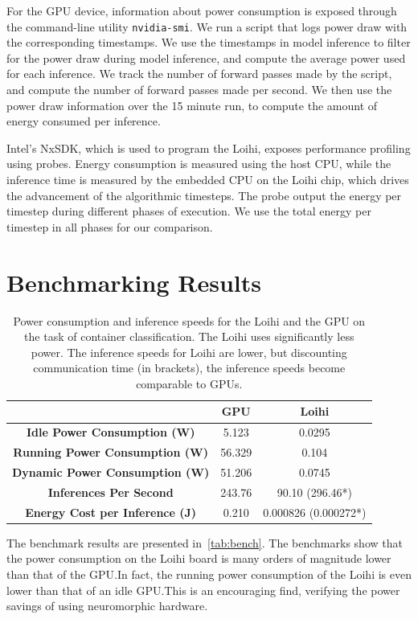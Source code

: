 \documentclass[fyp]{socreport}
\begin{document}
For the GPU device, information about power consumption is exposed through the
command-line utility \texttt{nvidia-smi}. We run a script that logs power draw
with the corresponding timestamps. We use the timestamps in model inference to
filter for the power draw during model inference, and compute the average power
used for each inference. We track the number of forward passes made by the
script, and compute the number of forward passes made per second. We then use
the power draw information over the 15 minute run, to compute the amount of
energy consumed per inference.

Intel's NxSDK, which is used to program the Loihi, exposes performance profiling
using probes. Energy consumption is measured using the host CPU, while the
inference time is measured by the embedded CPU on the Loihi chip, which drives
the advancement of the algorithmic timesteps. The probe output the energy per
timestep during different phases of execution. We use the total energy per
timestep in all phases for our comparison.

\section{Benchmarking Results}

\begin{table}
  \centering
  \begin{tabular}{ccc}
    \toprule
    & \textbf{GPU} & \textbf{Loihi} \\
    \midrule
    \textbf{Idle Power Consumption (W)} & 5.123 & 0.0295 \\
    \textbf{Running Power Consumption (W)} & 56.329 & 0.104 \\
    \textbf{Dynamic Power Consumption (W)} & 51.206 & 0.0745 \\
    \textbf{Inferences Per Second} & 243.76 & 90.10 (296.46*) \\
    \textbf{Energy Cost per Inference (J)} & 0.210 & 0.000826 (0.000272*) \\
    \bottomrule
  \end{tabular}
  \caption{Power consumption and inference speeds for the Loihi and the GPU on
    the task of container classification. The Loihi uses significantly less
    power. The inference speeds for Loihi are lower, but discounting
    communication time (in brackets), the inference speeds become comparable to
    GPUs.\label{tab:bench}}
\end{table}

The benchmark results are presented in~\autoref{tab:bench}. The benchmarks show
that the power consumption on the Loihi board is many orders of magnitude lower
than that of the GPU.\@ In fact, the running power consumption of the Loihi is
even lower than that of an idle GPU.\@ This is an encouraging find, verifying
the power savings of using neuromorphic hardware.
\end{document}
